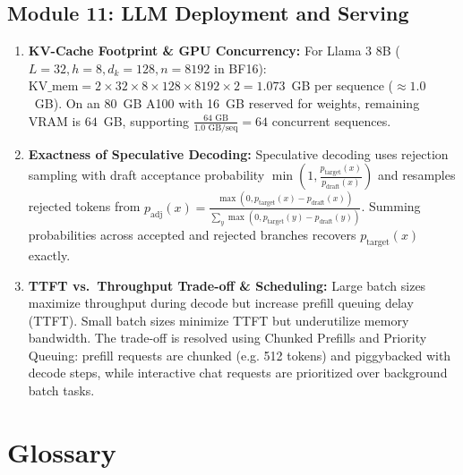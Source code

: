 \documentclass[11pt,a4paper]{article}
\begin{document}
	\subsection*{Module 11: LLM Deployment and Serving}
	\begin{enumerate}
		\item \textbf{KV-Cache Footprint \& GPU Concurrency:} For Llama 3 8B ($L=32, h=8, d_k=128, n=8192$ in BF16): $\mathrm{KV\_mem} = 2 \times 32 \times 8 \times 128 \times 8192 \times 2 = 1.073$~GB per sequence ($\approx 1.0$~GB). On an 80~GB A100 with 16~GB reserved for weights, remaining VRAM is $64$~GB, supporting $\frac{64\text{ GB}}{1.0\text{ GB/seq}} = 64$ concurrent sequences.
		\item \textbf{Exactness of Speculative Decoding:} Speculative decoding uses rejection sampling with draft acceptance probability $\min\left(1, \frac{p_{\text{target}}(x)}{p_{\text{draft}}(x)}\right)$ and resamples rejected tokens from $p_{\mathrm{adj}}(x) = \frac{\max(0, p_{\text{target}}(x) - p_{\text{draft}}(x))}{\sum_y \max(0, p_{\text{target}}(y) - p_{\text{draft}}(y))}$. Summing probabilities across accepted and rejected branches recovers $p_{\text{target}}(x)$ exactly.
		\item \textbf{TTFT vs.\ Throughput Trade-off \& Scheduling:} Large batch sizes maximize throughput during decode but increase prefill queuing delay (TTFT). Small batch sizes minimize TTFT but underutilize memory bandwidth. The trade-off is resolved using Chunked Prefills and Priority Queuing: prefill requests are chunked (e.g. 512 tokens) and piggybacked with decode steps, while interactive chat requests are prioritized over background batch tasks.
	\end{enumerate}

	\clearpage
	\section*{Glossary}
	
\end{document}
